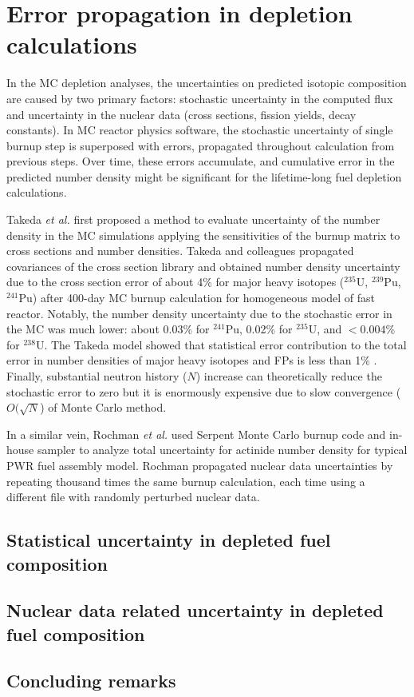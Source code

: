 \chapter{Error propagation in depletion calculations}
In the \gls{MC} depletion analyses, the uncertainties on predicted isotopic 
composition are caused by two primary factors: stochastic uncertainty in 
the computed flux and uncertainty in the nuclear data (cross sections, fission 
yields, decay constants). In \gls{MC} reactor physics software, the stochastic 
uncertainty of single burnup step is superposed with errors, propagated 
throughout calculation from previous steps. Over time, these errors 
accumulate, and cumulative error in the predicted number density might be 
significant for the lifetime-long fuel depletion calculations.

Takeda \emph{et al.} first proposed a method to evaluate uncertainty of the 
number density in the \gls{MC} simulations applying the sensitivities of the 
burnup matrix to cross sections and number densities. Takeda and colleagues 
propagated covariances of the cross section library and obtained number 
density uncertainty due to the cross section error of about 4\% for major 
heavy isotopes ($^{235}$U, $^{239}$Pu, $^{241}$Pu) after 400-day 
\gls{MC} burnup calculation for homogeneous model of fast reactor. Notably, 
the number density uncertainty due to the stochastic error in the \gls{MC} was 
much lower: about 0.03\% for $^{241}$Pu, 0.02\% for $^{235}$U, and $<0.004$\% 
for $^{238}$U. The Takeda model showed that statistical error contribution to 
the total error in number densities of major heavy isotopes and \glspl{FP} is 
less than 1\% \cite{takeda_estimation_1999}. Finally, substantial neutron 
history ($N$) increase can theoretically reduce the stochastic error to zero 
but it is enormously expensive due to slow convergence ($O(\sqrt{N}$) of Monte 
Carlo method.

In a similar vein, Rochman \emph{et al.} used Serpent Monte Carlo burnup code 
and in-house sampler to analyze total uncertainty for actinide number density 
for typical \gls{PWR} fuel assembly model. Rochman propagated nuclear data 
uncertainties by repeating thousand times the same burnup calculation, each 
time using a different file with randomly perturbed nuclear data.


\section{Statistical uncertainty in depleted fuel composition}

\section{Nuclear data related uncertainty in depleted fuel composition}

\section{Concluding remarks}